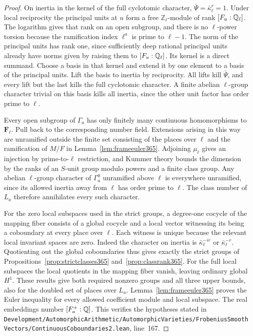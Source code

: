 \documentclass[a4paper,11pt]{article}
\theoremstyle{definition}
\theoremstyle{remark}
\newcommand{\ZZ}{\mathbb Z}\newcommand{\ord}{\operatorname{ord}}
\newcommand{\srcloc}[2]{{\small\nolinkurl{#1.lean}}, line~#2}
\numberwithin{equation}{section}
\begin{document}
\begin{proof}
On inertia in the kernel of the full cyclotomic character,
\(\bar\Psi=\bar\kappa_\ell^r=1\). Under local reciprocity the
principal units at \(u\) form a free \(\ZZ_\ell\)-module of
rank \([F_u:\mathbb Q_\ell]\). The logarithm gives that rank on
an open subgroup, and there is no \(\ell\)-power torsion
because the ramification index \(\ell^a\) is prime to
\(\ell-1\). The norm of the principal units has rank one,
since sufficiently deep rational principal units already
have norms given by raising them to \([F_u:\mathbb Q_\ell]\).
Its kernel is a direct summand. Choose a basis in that kernel
and extend it by one element to a basis of the principal
units. Lift the basis to inertia by reciprocity. All lifts
kill \(\bar\Psi\), and every lift but the last kills the full
cyclotomic character. A finite abelian \(\ell\)-group character
trivial on this basis kills all inertia, since the other unit
factor has order prime to \(\ell\).

Every open subgroup of \(\Gamma_a\) has only finitely many
continuous homomorphisms to \(\mathbf F_\ell\). Pull back to
the corresponding number field. Extensions arising in this
way are unramified outside the finite set consisting of the
places over \(\ell\) and the ramification of \(M/F\) in
Lemma~\ref{lem:frameeuler365}. Adjoining \(\mu_\ell\) gives
an injection by prime-to-\(\ell\) restriction, and Kummer
theory bounds the dimension by the ranks of an \(S\)-unit group
modulo powers and a finite class group. Any abelian
\(\ell\)-group character of \(\Gamma_a^0\) unramified above
\(\ell\) is everywhere unramified, since its allowed inertia
away from \(\ell\) has order prime to \(\ell\). The class
number of \(L_a\) therefore annihilates every such character.

For the zero local subspaces used in the strict groups, a
degree-one cocycle of the mapping fiber consists of a global
cocycle and a local vector witnessing its being a coboundary
at every place over \(\ell\). Each witness is unique because
the relevant local invariant spaces are zero. Indeed the
character on inertia is \(\bar\kappa_\ell^{-ir}\) or
\(\bar\kappa_\ell^{-r}\). Quotienting out the global
coboundaries thus gives exactly the strict groups of
Propositions~\ref{prop:strictclasses365}
and~\ref{prop:classrank365}. For the full local subspaces the
local quotients in the mapping fiber vanish, leaving ordinary
global \(H^1\). These results give both required nonzero
groups and all three upper bounds, also for the doubled set of
places over \(L_a\). Lemma~\ref{lem:frameeuler365} proves the
Euler inequality for every allowed coefficient module and
local subspace. The real embeddings number \([F_a^+:\mathbb Q]\).
This verifies the hypotheses stated in
\srcloc{Development/AutomorphicArithmetic/AutomorphicVarieties/FrobeniusSmoothVectors/ContinuousCoboundaries2}{167}.
\end{proof}
\end{document}
